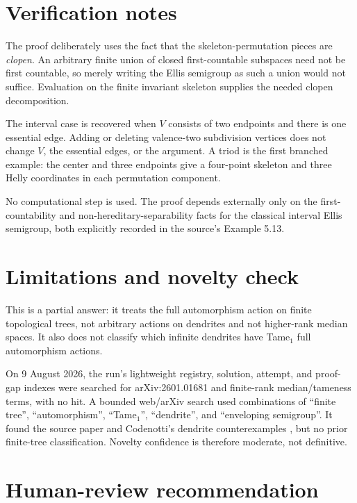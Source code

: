 \documentclass[11pt]{article}
\begin{document}
\section{Verification notes}

The proof deliberately uses the fact that the skeleton-permutation pieces are
\emph{clopen}. An arbitrary finite union of closed first-countable subspaces
need not be first countable, so merely writing the Ellis semigroup as such a
union would not suffice. Evaluation on the finite invariant skeleton supplies
the needed clopen decomposition.

The interval case is recovered when $V$ consists of two endpoints and there is
one essential edge. Adding or deleting valence-two subdivision vertices does
not change $V$, the essential edges, or the argument. A triod is the first
branched example: the center and three endpoints give a four-point skeleton
and three Helly coordinates in each permutation component.

No computational step is used. The proof depends externally only on the
first-countability and non-hereditary-separability facts for the classical
interval Ellis semigroup, both explicitly recorded in the source's
Example 5.13.

\section{Limitations and novelty check}

This is a partial answer: it treats the full automorphism action on finite
topological trees, not arbitrary actions on dendrites and not higher-rank
median spaces. It also does not classify which infinite dendrites have
Tame$_1$ full automorphism actions.

On 9 August 2026, the run's lightweight registry, solution, attempt, and
proof-gap indexes were searched for arXiv:2601.01681 and finite-rank
median/tameness terms, with no hit. A bounded web/arXiv search used combinations
of ``finite tree'', ``automorphism'', ``Tame$_1$'', ``dendrite'', and
``enveloping semigroup''. It found the source paper and Codenotti's dendrite
counterexamples \cite{Codenotti}, but no prior finite-tree classification.
Novelty confidence is therefore moderate, not definitive.

\section{Human-review recommendation}
\end{document}
